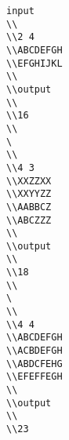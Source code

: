 \begin{verbatim}
input 
\\ 
\\2 4 
\\ABCDEFGH 
\\EFGHIJKL 
\\ 
\\output 
\\ 
\\16
\\
\ 
\\ 
\\4 3 
\\XXZZXX 
\\XXYYZZ 
\\AABBCZ 
\\ABCZZZ 
\\ 
\\output 
\\ 
\\18
\\
\ 
\\ 
\\4 4 
\\ABCDEFGH 
\\ACBDEFGH 
\\ABDCFEHG 
\\EFEFFEGH 
\\ 
\\output 
\\ 
\\23\end{verbatim}